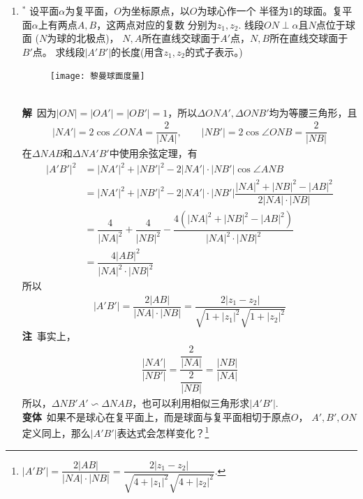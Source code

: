 \begin{enumerate}[label={【\textbf{例\thechapter.\arabic*}】},
 leftmargin=\inteval{\myenumleftmargin}pt,
 itemsep=\inteval{\myenumitempsep}pt,
 itemindent=\inteval{\myenumitemindent}pt]
\item $^*$ 设平面$ \alpha $为复平面，$ O $为坐标原点，以$ O $为球心作一个
半径为1的球面。复平面$ \alpha $上有两点$ A,B $，这两点对应的复数
分别为$ z_1,z_2 $. 线段$ ON\perp\alpha $且$ N $点位于球面
($ N $为球的北极点)，
$ N,A $所在直线交球面于$ A' $点，$ N,B $所在直线交球面于$ B' $点。
求线段$ |A'B'| $的长度(用含$ z_1,z_2 $的式子表示。) 
\begin{figure}[!ht]
    \centering
    \texttt{[image: 黎曼球面度量]}
\end{figure}
\\
\textbf{解}\ 因为$ |ON|=|OA'|=|OB'|=1 $，所以$ \Delta ONA',
\Delta ONB' $均为等腰三角形，且
\begin{align*}
    |NA'| =2\cos\angle ONA=\dfrac{2}{|NA|},\qquad
    |NB'| =2\cos\angle ONB=\dfrac{2}{|NB|} 
\end{align*}
在$ \Delta NAB $和$ \Delta NA'B' $中使用余弦定理，有
\begin{align*}
    |A'B'|^2 &=|NA'|^2+|NB'|^2-2|NA'|\cdot|NB'|\cos\angle ANB \\
    &=|NA'|^2+|NB'|^2-2|NA'|\cdot|NB'|
    \dfrac{|NA|^2+|NB|^2-|AB|^2}{2|NA|\cdot|NB|} \\
    &=\dfrac{4}{|NA|^2}+\dfrac{4}{|NB|^2}-
    \dfrac{4(|NA|^2+|NB|^2-|AB|^2)}{|NA|^2\cdot|NB|^2} \\
    &=\dfrac{4|AB|^2}{|NA|^2\cdot|NB|^2} 
\end{align*}
所以
\begin{gather*}
    |A'B'|=\dfrac{2|AB|}{|NA|\cdot|NB|}=
    \dfrac{2|z_1-z_2|}{\sqrt{1+|z_1|^2}\sqrt{1+|z_2|^2}}
\end{gather*}
\textbf{注}\ 事实上，
\begin{gather*}
    \dfrac{|NA'|}{|NB'|}=\dfrac{\dfrac{2}{|NA|}}{\dfrac{2}{|NB|}}
    =\dfrac{|NB|}{|NA|}
\end{gather*} 
所以，$ \Delta NB'A' \backsim \Delta NAB $，也可以利用相似三角形求$ |A'B'| $.\\
\textbf{变体}\ 如果不是球心在复平面上，而是球面与复平面相切于原点$ O $，
$ A',B',ON $定义同上，那么$ |A'B'| $表达式会怎样变化？\footnote{
    \q $ |A'B'|=\dfrac{2|AB|}{|NA|\cdot|NB|}=
    \dfrac{2|z_1-z_2|}{\sqrt{4+|z_1|^2}\sqrt{4+|z_2|^2}} $.  } 


\end{enumerate}
